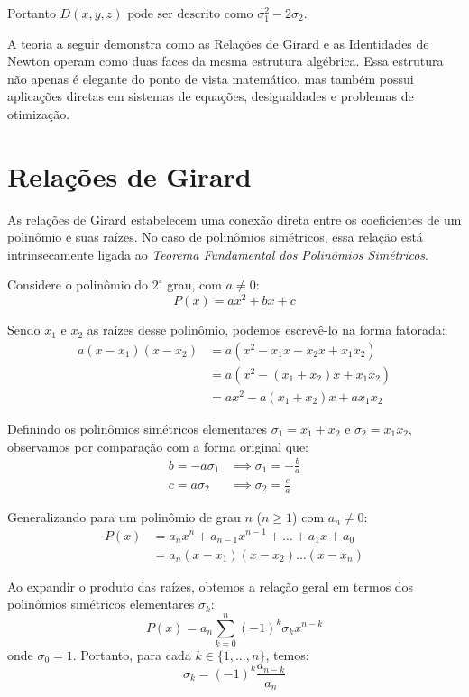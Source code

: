 Portanto $D(x, y, z) \text{ pode ser descrito como } \sigma_1^2 - 2\sigma_2$.

A teoria a seguir demonstra como as Relações de Girard e as Identidades de Newton operam como duas faces da mesma estrutura algébrica. Essa estrutura não apenas é elegante do ponto de vista matemático, mas também possui aplicações diretas em sistemas de equações, desigualdades e problemas de otimização.

\chapter{Relações de Girard}

As relações de Girard estabelecem uma conexão direta entre os coeficientes de um polinômio e suas raízes. No caso de polinômios simétricos, essa relação está intrinsecamente ligada ao \textit{Teorema Fundamental dos Polinômios Simétricos}.

Considere o polinômio do $2^\circ$ grau, com $a \neq 0$:
\begin{equation}
	P(x) = ax^2 + bx + c
\end{equation}

Sendo $x_1$ e $x_2$ as raízes desse polinômio, podemos escrevê-lo na forma fatorada:
\begin{align*}
	a(x - x_1)(x - x_2) & = a(x^2 - x_1x - x_2x + x_1x_2)  \\
	                    & = a(x^2 - (x_1 + x_2)x + x_1x_2) \\
	                    & = ax^2 - a(x_1 + x_2)x + ax_1x_2
\end{align*}

Definindo os polinômios simétricos elementares $\sigma_1 = x_1 + x_2$ e $\sigma_2 = x_1x_2$, observamos por comparação com a forma original que:
\begin{align*}
	b = -a\sigma_1 & \implies \sigma_1 = -\frac{b}{a} \\
	c = a\sigma_2  & \implies \sigma_2 = \frac{c}{a}
\end{align*}

Generalizando para um polinômio de grau $n$ ($n \geq 1$) com $a_n \neq 0$:
\begin{align*}
	P(x) & = a_n x^n + a_{n-1} x^{n-1} + \dots + a_1 x + a_0 \\
	     & = a_n(x - x_1)(x - x_2)\dots(x - x_n)
\end{align*}

Ao expandir o produto das raízes, obtemos a relação geral em termos dos polinômios simétricos elementares $\sigma_k$:
\begin{equation}
	P(x) = a_n \sum_{k=0}^{n} (-1)^k \sigma_k x^{n-k}
\end{equation}
onde $\sigma_0 = 1$. Portanto, para cada $k \in \{1, \dots, n\}$, temos:
\begin{equation}
	\sigma_k = (-1)^k \frac{a_{n-k}}{a_n}
\end{equation}

